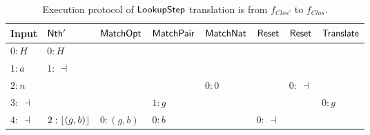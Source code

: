 \begin{table}[t]
  {
  \scriptsize
  \centering
  \begin{tabular}{l||l|l|l|l|l|l|l}
    Input       & $\mathsf{Nth'}$      & $\mathsf{MatchOpt}$       & $\mathsf{MatchPair}$     & $\mathsf{MatchNat}$ & $\mathsf{Reset}$ & $\mathsf{Reset}$ & $\mathsf{Translate}$ \\ \hline
    $0:H$       & $0:H$            &                       &                      &                 &              &              &                  \\
    $1:a$       & $1:~\dashv$      &                       &                      &                 &              &              &                  \\
    $2:n$       &                  &                       &                      & $0:0$           &              & $0:~\dashv$  &                  \\
    $3:~\dashv$ &                  &                       & $1: g$               &                 &              &              & $0:g$            \\
    $4:~\dashv$ & $2:\left\lfloor {(g,b)} \right\rfloor$ & $0:(g,b)$             & $0:b$                &                 & $0:~\dashv$  &              &                  \\
  \end{tabular}
  }
  \caption{Execution protocol of $\mathsf{LookupStep}$ %
    translation is from $f_{Clos'}$ to $f_{Clos}$.}
  \label{tab:exec-LookupStep-0}
\end{table}


